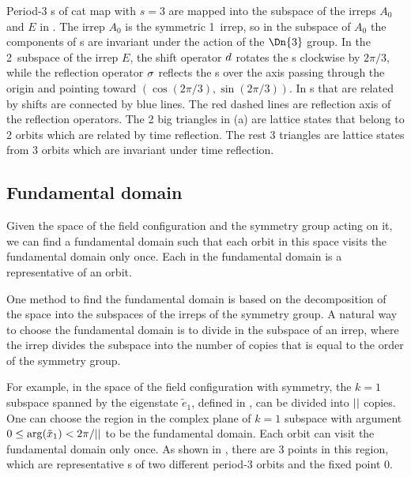 Period-3 {\lattstate}s of cat map with $s=3$ are mapped into the subspace
of the irreps $A_0$ and $E$ in .
The irrep $A_0$ is the symmetric 1\dmn\ irrep, so in the subspace of $A_0$ the components
of {\lattstate}s are invariant under the action of the $\Dn{3}$ group.
In the 2\dmn\ subspace of the irrep $E$, the shift operator $d$ rotates the
{\lattstate}s clockwise by $2\pi/3$, while the reflection operator $\sigma$ reflects the {\lattstate}s
over the axis passing through the origin and pointing toward $(\cos(2\pi/3),\sin(2\pi/3))$.
In 
{\lattstate}s that are related by shifts are connected by blue lines.
The red dashed lines are reflection axis of the reflection operators.
The 2 big triangles in  (a) are lattice states
that belong to 2 orbits which are related by time reflection. The rest 3 triangles
are lattice states from 3 orbits which are invariant under time reflection.

\subsection{Fundamental domain} %

Given the space of the field configuration and the symmetry group acting on it,
we can find a fundamental domain such that each orbit in this space
visits the fundamental domain only once.
Each {\lattstate} in the fundamental domain is a representative {\lattstate} of an
orbit.

One method to find the fundamental domain is based on the decomposition
of the space into the subspaces of the irreps of the symmetry group.
A natural way to choose the fundamental domain is to divide in the
subspace of an irrep, where the irrep divides the subspace into the number
of copies that is equal to the order of the symmetry group.

For example, in the space of the field configuration with \Cn{\cl{}} symmetry, the $k=1$ subspace
spanned by the eigenstate $\tilde{e}_1$, defined in , can be divided
into ${||}$ copies. One can choose the region in the complex plane of $k=1$ subspace
with argument $0\leq\arg(\tilde{x}_{1})<2\pi/{||}$ to be the fundamental domain.
Each orbit can visit the fundamental domain only once. As shown in ,
there are 3 points in this region, which are representative {\lattstate}s of two different
period-3 orbits and the fixed point $0$.

